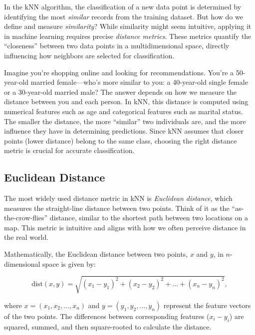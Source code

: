 \documentclass[
  11pt,
]{book}
\theoremstyle{definition}
\theoremstyle{definition}
\theoremstyle{definition}
\theoremstyle{definition}
\theoremstyle{remark}
\begin{document}
In the kNN algorithm, the classification of a new data point is determined by identifying the most \emph{similar} records from the training dataset. But how do we define and measure \emph{similarity}? While similarity might seem intuitive, applying it in machine learning requires precise \emph{distance metrics}. These metrics quantify the ``closeness'' between two data points in a multidimensional space, directly influencing how neighbors are selected for classification.

Imagine you're shopping online and looking for recommendations. You're a 50-year-old married female---who's more similar to you: a 40-year-old single female or a 30-year-old married male? The answer depends on how we measure the distance between you and each person. In kNN, this distance is computed using numerical features such as age and categorical features such as marital status. The smaller the distance, the more ``similar'' two individuals are, and the more influence they have in determining predictions. Since kNN assumes that closer points (lower distance) belong to the same class, choosing the right distance metric is crucial for accurate classification.

\subsection*{Euclidean Distance}\label{euclidean-distance}


The most widely used distance metric in kNN is \emph{Euclidean distance}, which measures the straight-line distance between two points. Think of it as the ``as-the-crow-flies'' distance, similar to the shortest path between two locations on a map. This metric is intuitive and aligns with how we often perceive distance in the real world.

Mathematically, the Euclidean distance between two points, \(x\) and \(y\), in \(n\)-dimensional space is given by:

\[
\text{dist}(x, y) = \sqrt{(x_1 - y_1)^2 + (x_2 - y_2)^2 + \ldots + (x_n - y_n)^2}, 
\]

where \(x = (x_1, x_2, \ldots, x_n)\) and \(y = (y_1, y_2, \ldots, y_n)\) represent the feature vectors of the two points. The differences between corresponding features (\(x_i - y_i\)) are squared, summed, and then square-rooted to calculate the distance.
\end{document}
